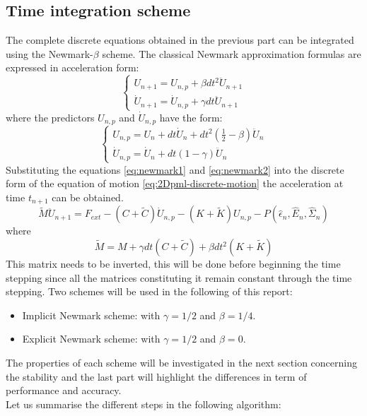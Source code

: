 \subsection{Time integration scheme}
The complete discrete equations obtained in the previous part can be integrated using the Newmark-$\beta$ scheme. The classical Newmark approximation formulas are expressed in acceleration form:
\begin{equation}
\begin{cases}
U_{n+1} = U_{n,p} + \beta dt^2 \ddot{U}_{n+1} \\
\dot{U}_{n+1} = \dot{U}_{n,p} + \gamma dt \ddot{U}_{n+1}
\end{cases}
\label{eq:newmark1}
\end{equation}
where the predictors $U_{n,p}$ and $\dot{U}_{n,p}$ have the form:
\begin{equation}
\begin{cases}
U_{n,p} = U_n + dt \dot{U}_n + dt^2 \left(\frac{1}{2} -\beta  \right)\ddot{U}_n \\
\dot{U}_{n,p} = \dot{U}_n + dt (1-\gamma)\ddot{U}_n
\end{cases}
\label{eq:newmark2}
\end{equation}
Substituting the equations \ref{eq:newmark1} and \ref{eq:newmark2} into the discrete form of the equation of motion \ref{eq:2Dpml-discrete-motion} the acceleration at time $t_{n+1}$ can be obtained.
\begin{equation}
\tilde{M}\ddot{U}_{n+1} = F_{ext} - \left(C+\tilde{C}\right)\dot{U}_{n,p} - \left(K+\tilde{K}\right)U_{n,p} - P(\hat{\epsilon}_n,\hat{E}_n,\hat{\Sigma}_n)
\end{equation}
where 
\begin{equation}
\tilde{M} = M + \gamma dt \left(C+\tilde{C}\right) + \beta dt^2 \left(K+\tilde{K}\right)
\end{equation}
This matrix needs to be inverted, this will be done before beginning the time stepping since all the matrices constituting it remain constant through the time stepping. Two schemes will be used in the following of this report:
\begin{itemize}
\item Implicit Newmark scheme: with $\gamma = 1/2$ and $\beta = 1/4$.
\item Explicit Newmark scheme: with $\gamma = 1/2$ and $\beta = 0$.
\end{itemize} 
The properties of each scheme will be investigated in the next section concerning the stability and the last part will highlight the differences in term of performance and accuracy.\\
Let us summarise the different steps in the following algorithm:










 





